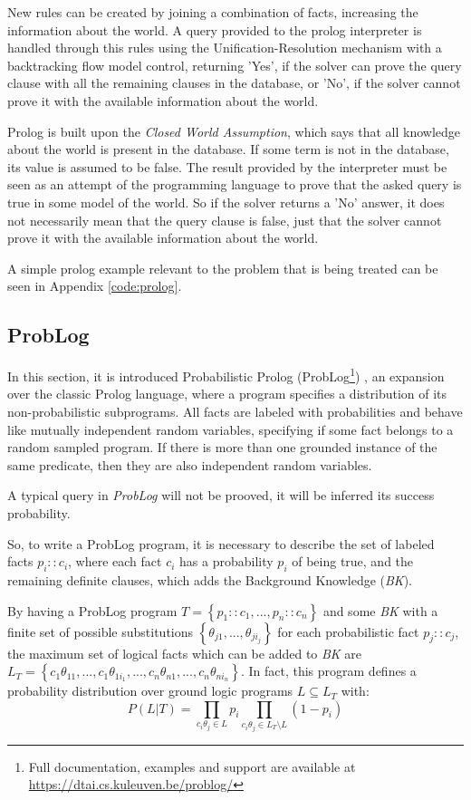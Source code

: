 New rules can be created by joining a combination of facts, increasing the
information about the world. A query provided to the prolog interpreter is
handled through this rules using the Unification-Resolution mechanism with a
backtracking flow model control, returning 'Yes', if the solver can prove the
query clause with all the remaining clauses in the database, or 'No', if the
solver cannot prove it with the available information about the world.

Prolog is built upon the \textit{Closed World Assumption}, which says that all
knowledge about the world is present in the database. If some term is not in the
database, its value is assumed to be false. The result provided by the
interpreter must be seen as an attempt of the programming language to prove that
the asked query is true in some model of the world. So if the solver returns a
'No' answer, it does not necessarily mean that the query clause is false, just
that the solver cannot prove it with the available information about the world.

A simple prolog example relevant to the problem that is being treated can be
seen in Appendix \ref{code:prolog}.

\subsection{ProbLog}
In this section, it is introduced Probabilistic Prolog (ProbLog\footnote{Full
documentation, examples and support are available at
\url{https://dtai.cs.kuleuven.be/problog/}}) \cite{Kimmig2011,DeRaedt2007}, an
expansion over the classic Prolog language, where a program specifies a
distribution of its non-probabilistic subprograms. All facts are
labeled with probabilities and behave like mutually independent random
variables, specifying if some fact belongs to a random sampled program.
If there is more than one grounded instance of the same predicate, then
they are also independent random variables.

A typical query in \textit{ProbLog} will not be prooved, it will be inferred its
success probability.

So, to write a ProbLog program, it is necessary to describe the set of labeled
facts $p_i :: c_i$, where each fact $c_i$ has a probability $p_i$ of being true,
and the remaining definite clauses, which adds the Background Knowledge
(\textit{BK}).

By having a ProbLog program $T = \left\{ p_1 :: c_1, ..., p_n :: c_n \right\}$
and some \textit{BK} with a finite set of possible substitutions
$\left\{ \theta_{j1}, ..., \theta_{ji_j}  \right\}$ for each probabilistic fact
$p_j :: c_j$, the maximum set of logical facts which can be added to \textit{BK}
are $L_T = \left\{ c_1\theta_{11}, ..., c_1\theta_{1i_1}, ..., c_n\theta_{n1},
..., c_n\theta_{ni_n} \right\}$. In fact, this program defines a probability
distribution over ground logic programs $L \subseteq L_T$ with:
\begin{equation}
    P(L|T) = \displaystyle\prod_{c_i\theta_j \in L} p_i
    \displaystyle\prod_{c_i\theta_j \in L_T \setminus L} (1-p_i)
\end{equation}

